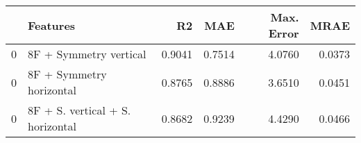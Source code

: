 \begin{tabular}{llrrrr}
\toprule
{} &                          Features &     R2 &    MAE &  Max. Error &   MRAE \\
\midrule
0 &            8F + Symmetry vertical & 0.9041 & 0.7514 &      4.0760 & 0.0373 \\
0 &          8F + Symmetry horizontal & 0.8765 & 0.8886 &      3.6510 & 0.0451 \\
0 &  8F + S. vertical + S. horizontal & 0.8682 & 0.9239 &      4.4290 & 0.0466 \\
\bottomrule
\end{tabular}
